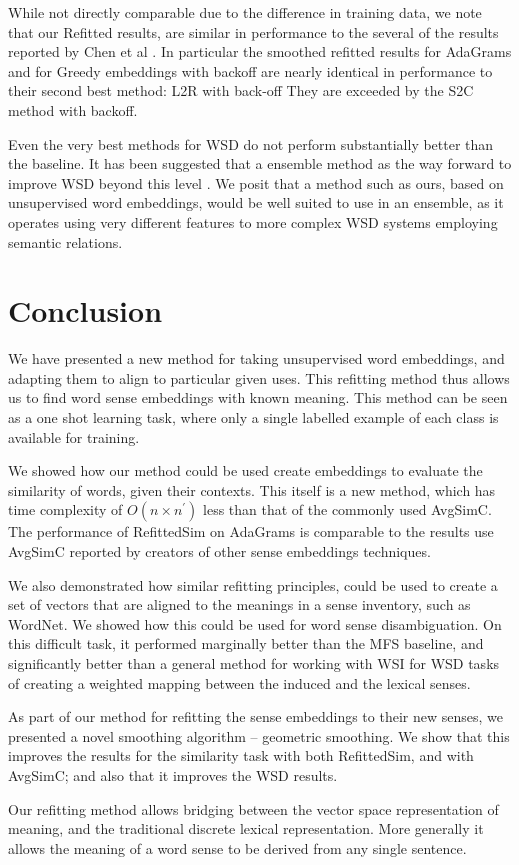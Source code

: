 \documentclass{sig-alternate}
\begin{document}
While not directly comparable due to the difference in training data, we note that our Refitted results, are similar in performance to the several of the results reported by Chen et al \parencite{Chen2014}. In particular the smoothed refitted results for AdaGrams and for Greedy embeddings with backoff are nearly identical in performance to their second best method: L2R with back-off They are exceeded by the S2C method with backoff. 

Even the very best methods for WSD do not perform substantially better than the baseline. It has been suggested that a ensemble method as the way forward to improve WSD beyond this level \cite{saarikoski2006building,saarikoski2006defining}.
We posit that a method such as ours, based on unsupervised word embeddings, would be well suited to use in an ensemble, as it operates using very different features to more complex WSD systems employing semantic relations.


\section{Conclusion}\label{conclusion}

We have presented a new method for taking unsupervised word embeddings, and adapting them to align to particular given uses. This refitting method thus allows us to find word sense embeddings with known meaning. This method can be seen as a one shot learning task, where only a single labelled example of each class is available for training.

We showed how our method could be used create embeddings to evaluate the similarity of words, given their contexts. This itself is a new method, which has time complexity of $O(n \times n^\prime)$ less than that of the commonly used AvgSimC. The performance of RefittedSim on AdaGrams is comparable to the results use AvgSimC reported by creators of other sense embeddings techniques.

We also demonstrated how similar refitting principles, could be used to create a set of vectors that are aligned to the meanings in a sense inventory, such as WordNet. We showed how this could be used for word sense disambiguation. On this difficult task, it performed marginally better than the MFS baseline, and significantly better than a general method for working with WSI for WSD tasks of creating a weighted mapping between the induced and the lexical senses.

As part of our method for refitting the sense embeddings to their new senses, we presented a novel smoothing algorithm -- geometric smoothing.
We show that this improves the results for the similarity task with both RefittedSim, and with AvgSimC; and also that it improves the WSD results.

Our refitting method allows bridging between the vector space representation of meaning, and the traditional discrete lexical representation. More generally it allows the meaning of a word sense to be derived from any single sentence.

\newpage
\printbibliography
\end{document}
